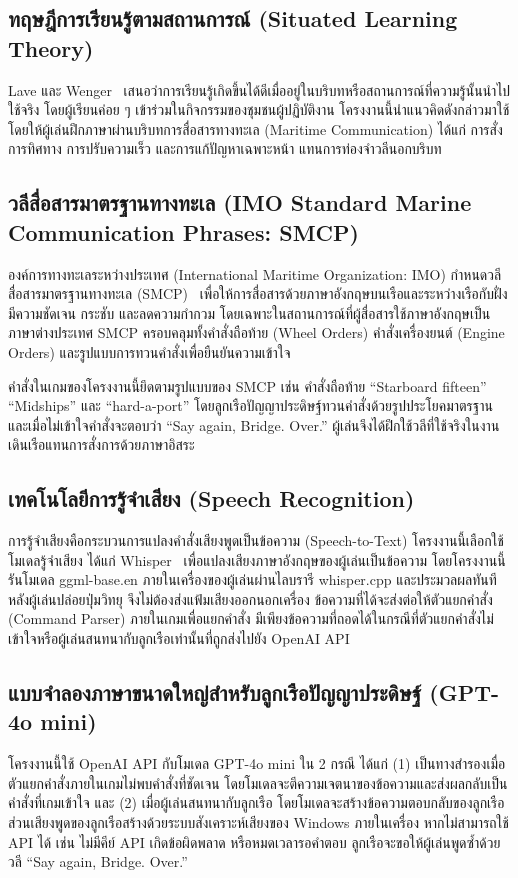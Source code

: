 \subsection{ทฤษฎีการเรียนรู้ตามสถานการณ์ (Situated Learning Theory)}

Lave และ Wenger~\cite{lave1991} เสนอว่าการเรียนรู้เกิดขึ้นได้ดีเมื่ออยู่ในบริบทหรือสถานการณ์ที่ความรู้นั้นนำไปใช้จริง โดยผู้เรียนค่อย ๆ เข้าร่วมในกิจกรรมของชุมชนผู้ปฏิบัติงาน โครงงานนี้นำแนวคิดดังกล่าวมาใช้โดยให้ผู้เล่นฝึกภาษาผ่านบริบทการสื่อสารทางทะเล (Maritime Communication) ได้แก่ การสั่งการทิศทาง การปรับความเร็ว และการแก้ปัญหาเฉพาะหน้า แทนการท่องจำวลีนอกบริบท

\subsection{วลีสื่อสารมาตรฐานทางทะเล (IMO Standard Marine Communication Phrases: SMCP)}

องค์การทางทะเลระหว่างประเทศ (International Maritime Organization: IMO) กำหนดวลีสื่อสารมาตรฐานทางทะเล (SMCP)~\cite{imo2002smcp} เพื่อให้การสื่อสารด้วยภาษาอังกฤษบนเรือและระหว่างเรือกับฝั่งมีความชัดเจน กระชับ และลดความกำกวม โดยเฉพาะในสถานการณ์ที่ผู้สื่อสารใช้ภาษาอังกฤษเป็นภาษาต่างประเทศ SMCP ครอบคลุมทั้งคำสั่งถือท้าย (Wheel Orders) คำสั่งเครื่องยนต์ (Engine Orders) และรูปแบบการทวนคำสั่งเพื่อยืนยันความเข้าใจ

คำสั่งในเกมของโครงงานนี้ยึดตามรูปแบบของ SMCP เช่น คำสั่งถือท้าย ``Starboard fifteen'' ``Midships'' และ ``hard-a-port'' โดยลูกเรือปัญญาประดิษฐ์ทวนคำสั่งด้วยรูปประโยคมาตรฐาน และเมื่อไม่เข้าใจคำสั่งจะตอบว่า ``Say again, Bridge. Over.'' ผู้เล่นจึงได้ฝึกใช้วลีที่ใช้จริงในงานเดินเรือแทนการสั่งการด้วยภาษาอิสระ

\subsection{เทคโนโลยีการรู้จำเสียง (Speech Recognition)}

การรู้จำเสียงคือกระบวนการแปลงคำสั่งเสียงพูดเป็นข้อความ (Speech-to-Text) โครงงานนี้เลือกใช้โมเดลรู้จำเสียง ได้แก่ Whisper~\cite{radford2023} เพื่อแปลงเสียงภาษาอังกฤษของผู้เล่นเป็นข้อความ โดยโครงงานนี้รันโมเดล ggml-base.en ภายในเครื่องของผู้เล่นผ่านไลบรารี whisper.cpp และประมวลผลทันทีหลังผู้เล่นปล่อยปุ่มวิทยุ จึงไม่ต้องส่งแฟ้มเสียงออกนอกเครื่อง ข้อความที่ได้จะส่งต่อให้ตัวแยกคำสั่ง (Command Parser) ภายในเกมเพื่อแยกคำสั่ง มีเพียงข้อความที่ถอดได้ในกรณีที่ตัวแยกคำสั่งไม่เข้าใจหรือผู้เล่นสนทนากับลูกเรือเท่านั้นที่ถูกส่งไปยัง OpenAI API

\subsection{แบบจำลองภาษาขนาดใหญ่สำหรับลูกเรือปัญญาประดิษฐ์ (GPT-4o mini)}

โครงงานนี้ใช้ OpenAI API กับโมเดล GPT-4o mini ใน 2 กรณี ได้แก่ (1) เป็นทางสำรองเมื่อตัวแยกคำสั่งภายในเกมไม่พบคำสั่งที่ชัดเจน โดยโมเดลจะตีความเจตนาของข้อความและส่งผลกลับเป็นคำสั่งที่เกมเข้าใจ และ (2) เมื่อผู้เล่นสนทนากับลูกเรือ โดยโมเดลจะสร้างข้อความตอบกลับของลูกเรือ ส่วนเสียงพูดของลูกเรือสร้างด้วยระบบสังเคราะห์เสียงของ Windows ภายในเครื่อง หากไม่สามารถใช้ API ได้ เช่น ไม่มีคีย์ API เกิดข้อผิดพลาด หรือหมดเวลารอคำตอบ ลูกเรือจะขอให้ผู้เล่นพูดซ้ำด้วยวลี ``Say again, Bridge. Over.''

